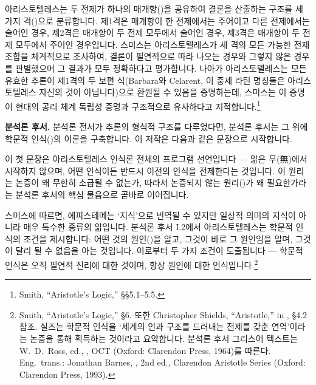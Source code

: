 \documentclass[12pt, a4paper]{article}
\begin{document}
아리스토텔레스는 두 전제가 하나의 매개항()을 공유하여 결론을 산출하는 구조를 세 가지 격()으로 분류합니다. 제1격은 매개항이 한 전제에서는 주어이고 다른 전제에서는 술어인 경우, 제2격은 매개항이 두 전제 모두에서 술어인 경우, 제3격은 매개항이 두 전제 모두에서 주어인 경우입니다. 스미스는 아리스토텔레스가 세 격의 모든 가능한 전제 조합을 체계적으로 조사하여, 결론이 필연적으로 따라 나오는 경우와 그렇지 않은 경우를 판별했으며 그 결과가 모두 정확하다고 평가합니다. 나아가 아리스토텔레스는 모든 유효한 추론이 제1격의 두 보편 식(Barbara와 Celarent, 이 중세 라틴 명칭들은 아리스토텔레스 자신의 것이 아닙니다)으로 환원될 수 있음을 증명하는데, 스미스는 이 증명이 현대의 공리 체계 독립성 증명과 구조적으로 유사하다고 지적합니다.\footnote{Smith, ``Aristotle's Logic,'' §§5.1--5.5.}

\textbf{분석론 후서.} 분석론 전서가 추론의 형식적 구조를 다루었다면, 분석론 후서는 그 위에 학문적 인식()의 이론을 구축합니다. 이 저작은 다음과 같은 문장으로 시작합니다.


이 첫 문장은 아리스토텔레스 인식론 전체의 프로그램 선언입니다 --- 앎은 무(無)에서 시작하지 않으며, 어떤 인식이든 반드시 이전의 인식을 전제한다는 것입니다. 이 원리는 논증이 왜 무한히 소급될 수 없는가, 따라서 논증되지 않는 원리()가 왜 필요한가라는 분석론 후서의 핵심 물음으로 곧바로 이어집니다.

스미스에 따르면, 에피스테메는 `지식'으로 번역될 수 있지만 일상적 의미의 지식이 아니라 매우 특수한 종류의 앎입니다. 분석론 후서 I.2에서 아리스토텔레스는 학문적 인식의 조건을 제시합니다: 어떤 것의 원인()을 알고, 그것이 바로 그 원인임을 알며, 그것이 달리 될 수 없음을 아는 것입니다. 이로부터 두 가지 조건이 도출됩니다 --- 학문적 인식은 오직 필연적 진리에 대한 것이며, 항상 원인에 대한 인식입니다.\footnote{Smith, ``Aristotle's Logic,'' §6. 또한 Christopher Shields, ``Aristotle,'' in , §4.2 참조. 실즈는 학문적 인식을 `세계의 인과 구조를 드러내는 전제를 갖춘 연역'이라는 논증을 통해 획득하는 것이라고 요약합니다. 분석론 후서 그리스어 텍스트는 W.\ D.\ Ross, ed., , OCT (Oxford: Clarendon Press, 1964)를 따른다. Eng.\ trans.: Jonathan Barnes, , 2nd ed., Clarendon Aristotle Series (Oxford: Clarendon Press, 1993).}
\end{document}
